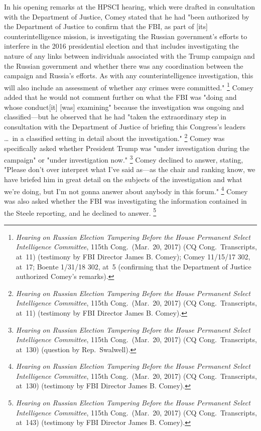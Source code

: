 In his opening remarks at the HPSCI hearing, which were drafted in consultation with the Department of Justice, Comey stated that he had "been authorized by the Department of Justice to confirm that the FBI, as part of [its] counterintelligence mission, is investigating the Russian government's efforts to interfere in the 2016 presidential election and that includes investigating the nature of any links between individuals associated with the Trump campaign and the Russian government and whether there was any coordination between the campaign and Russia's efforts.
As with any counterintelligence investigation, this will also include an assessment of whether any crimes were committed."%
\footnote{\textit{Hearing on Russian Election Tampering Before the House Permanent Select Intelligence Committee}, 115th Cong.\ (Mar.~20, 2017) (CQ Cong.\ Transcripts, at~11) (testimony by FBI Director James B. Comey);
Comey 11/15/17 302, at~17;
Boente 1/31/18 302, at~5 (confirming that the Department of Justice authorized Comey's remarks).}
Comey added that he would not comment further on what the FBI was "doing and whose conduct[it] [was] examining" because the investigation was ongoing and classified---but he observed that he had "taken the extraordinary step in consultation with the Department of Justice of briefing this Congress's leaders \dots\ in a classified setting in detail about the investigation."%
\footnote{\textit{Hearing on Russian Election Tampering Before the House Permanent Select Intelligence Committee}, 115th Cong.\ (Mar.~20, 2017) (CQ Cong.\ Transcripts, at~11) (testimony by FBI Director James B. Comey).}
Comey was specifically asked whether President Trump was "under investigation during the campaign" or "under investigation now."%
\footnote{\textit{Hearing on Russian Election Tampering Before the House Permanent Select Intelligence Committee}, 115th Cong.\ (Mar.~20, 2017) (CQ Cong.\ Transcripts, at~130) (question by Rep.~Swalwell).}
Comey declined to answer, stating, "Please don't over interpret what I've said as---as the chair and ranking know, we have briefed him in great detail on the subjects of the investigation and what we're doing, but I'm not gonna answer about anybody in this forum."%
\footnote{\textit{Hearing on Russian Election Tampering Before the House Permanent Select Intelligence Committee}, 115th Cong.\ (Mar.~20, 2017) (CQ Cong.\ Transcripts, at~130) (testimony by FBI Director James B. Comey).}
Comey was also asked whether the FBI was investigating the information contained in the Steele reporting, and he declined to answer.%
\footnote{\textit{Hearing on Russian Election Tampering Before the House Permanent Select Intelligence Committee}, 115th Cong.\ (Mar.~20, 2017) (CQ Cong.\ Transcripts, at~143) (testimony by FBI Director James B. Comey).}

